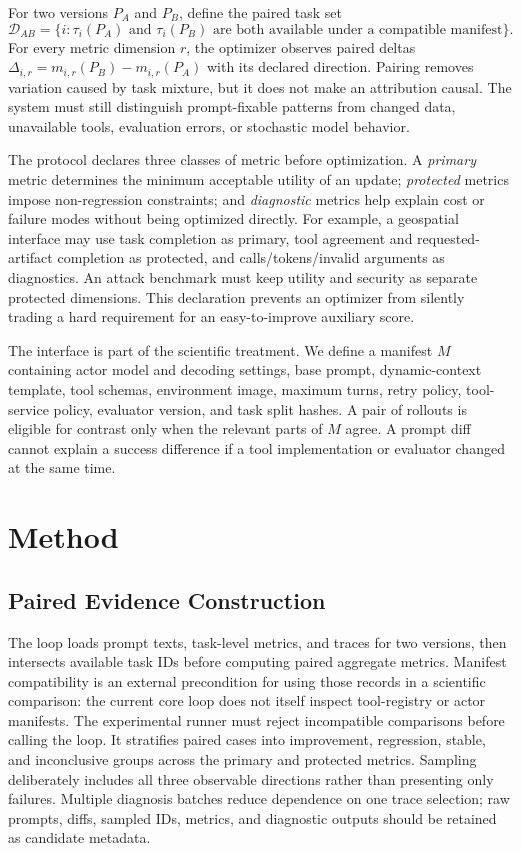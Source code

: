 \documentclass[10pt]{article}
\begin{document}
For two versions $P_A$ and $P_B$, define the paired task set
\begin{equation}
\mathcal{D}_{AB}=\{i: \tau_i(P_A)\text{ and }\tau_i(P_B)\text{ are both available under a compatible manifest}\}.
\end{equation}
For every metric dimension $r$, the optimizer observes paired deltas $\Delta_{i,r}=m_{i,r}(P_B)-m_{i,r}(P_A)$ with its declared direction. Pairing removes variation caused by task mixture, but it does not make an attribution causal. The system must still distinguish prompt-fixable patterns from changed data, unavailable tools, evaluation errors, or stochastic model behavior.

The protocol declares three classes of metric before optimization. A \emph{primary} metric determines the minimum acceptable utility of an update; \emph{protected} metrics impose non-regression constraints; and \emph{diagnostic} metrics help explain cost or failure modes without being optimized directly. For example, a geospatial interface may use task completion as primary, tool agreement and requested-artifact completion as protected, and calls/tokens/invalid arguments as diagnostics. An attack benchmark must keep utility and security as separate protected dimensions. This declaration prevents an optimizer from silently trading a hard requirement for an easy-to-improve auxiliary score.

The interface is part of the scientific treatment. We define a manifest $M$ containing actor model and decoding settings, base prompt, dynamic-context template, tool schemas, environment image, maximum turns, retry policy, tool-service policy, evaluator version, and task split hashes. A pair of rollouts is eligible for contrast only when the relevant parts of $M$ agree. A prompt diff cannot explain a success difference if a tool implementation or evaluator changed at the same time.

\section{Method}
\subsection{Paired Evidence Construction}
The loop loads prompt texts, task-level metrics, and traces for two versions, then intersects available task IDs before computing paired aggregate metrics. Manifest compatibility is an external precondition for using those records in a scientific comparison: the current core loop does not itself inspect tool-registry or actor manifests. The experimental runner must reject incompatible comparisons before calling the loop. It stratifies paired cases into improvement, regression, stable, and inconclusive groups across the primary and protected metrics. Sampling deliberately includes all three observable directions rather than presenting only failures. Multiple diagnosis batches reduce dependence on one trace selection; raw prompts, diffs, sampled IDs, metrics, and diagnostic outputs should be retained as candidate metadata.
\end{document}
